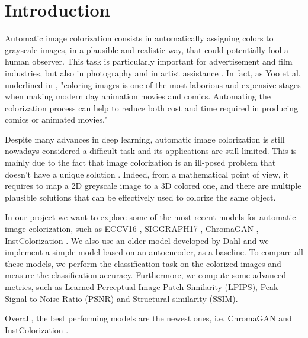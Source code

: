 \section{Introduction}
Automatic image colorization consists in automatically assigning colors to grayscale images, in a plausible and
realistic way, that could potentially fool a human observer. This task is particularly important for advertisement
and film industries, but also in photography and in artist assistance \cite{chromagan}.
In fact, as Yoo et al. underlined in \cite{animation}, "coloring images is one of the most laborious and expensive
stages when making modern day animation movies and comics. Automating the colorization process can help to reduce
both cost and time required in producing comics or animated movies."

Despite many advances in deep learning, automatic image colorization is still nowadays considered a difficult task
and its applications are still limited. This is mainly due to the fact that image colorization is an ill-posed
problem that doesn't have a unique solution \cite{su} \cite{chromagan}. Indeed, from a mathematical point of view,
it requires to map a 2D greyscale image to a 3D colored one, and there are multiple plausible solutions that can
be effectively used to colorize the same object.

In our project we want to explore some of the most recent models for automatic image colorization, such as
ECCV16 \cite{zhang}, SIGGRAPH17 \cite{siggraph}, ChromaGAN \cite{chromagan}, InstColorization \cite{su}.
We also use an older model developed by Dahl \cite{dahl} and we implement a simple model based on an autoencoder,
as a baseline.
To compare all these models, we perform the classification task on the colorized images and measure the
classification accuracy. Furthermore, we compute some advanced metrics, such as Learned Perceptual Image Patch
Similarity (LPIPS), Peak Signal-to-Noise Ratio (PSNR) and Structural similarity (SSIM).

Overall, the best performing models are the newest ones, i.e. ChromaGAN \cite{chromagan} and InstColorization \cite{su}.




